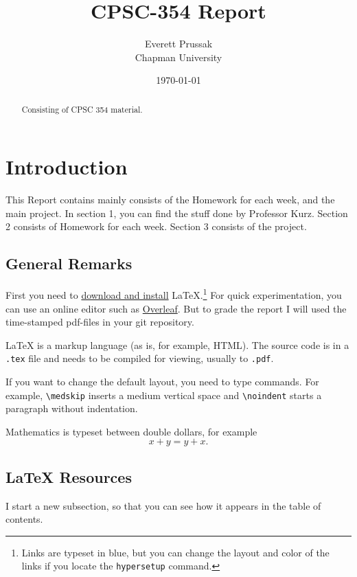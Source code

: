 \documentclass{article}
\title{CPSC-354 Report}
\author{Everett Prussak  \\ Chapman University}
\date{\today}
\theoremstyle{theorem}
\theoremstyle{definition}
\theoremstyle{remark}
\begin{document}
\maketitle

\begin{abstract}
Consisting of CPSC 354 material.
\end{abstract}

\tableofcontents

\section{Introduction}\label{intro}

This Report contains mainly consists of the Homework for each week, and the main project. In section 1, you can find the stuff done by Professor Kurz. Section 2 consists of Homework for each week. Section 3 consists of the project.

\subsection{General Remarks}

First you need to \href{https://www.latex-project.org/get/}{download and install} LaTeX.\footnote{Links are typeset in blue, but you can change the layout and color of the links if you locate the  \texttt{hypersetup} command.}
%
For quick experimentation, you can use an online editor such as \href{https://www.overleaf.com/learn}{Overleaf}. But to grade the report I will used the time-stamped pdf-files in your git repository.  

 
\medskip\noindent
LaTeX is a markup language (as is, for example, HTML). The source code is in a \verb+.tex+ file and needs to be compiled for viewing, usually to \verb+.pdf+.


\medskip\noindent
If you want to change the default layout, you need to type commands. For example, \verb+\medskip+ inserts a medium vertical space and \verb+\noindent+ starts a paragraph without indentation.
 
\medskip\noindent
Mathematics is typeset between double dollars, for example $$x+y=y+x.$$


\subsection{LaTeX Resources}

I start a new subsection, so that you can see how it appears in the table of contents.
\end{document}
